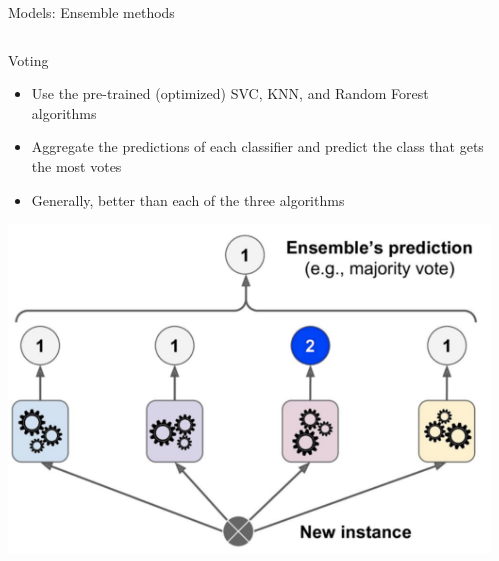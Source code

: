 \documentclass{if-beamer}
\begin{document}
\begin{frame}{Models:  Ensemble methods} 

  \begin{columns}
   \begin{column}{0.5\textwidth} 
   \begin{exampleblock}{Voting}
   \begin{itemize}
   \item Use the pre-trained (optimized) SVC, KNN, and Random Forest algorithms
   \item Aggregate the predictions of each classifier and predict the class that gets the most votes
   \item Generally, better than each of the three algorithms
      \end{itemize}
      \end{exampleblock}
      
   \includegraphics[scale=0.2]{./figs/voting.png} 

   \end{column} 
    
   \begin{column}{0.5\textwidth}
 

\end{column}
\end{columns}
\end{frame}
\end{document}
